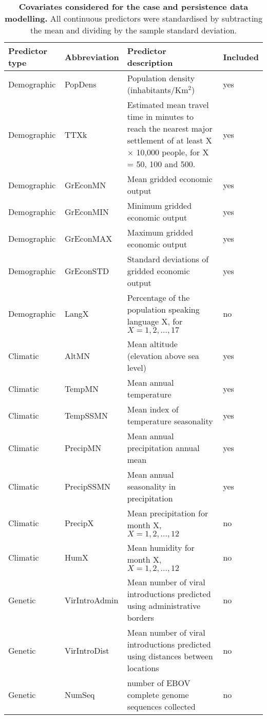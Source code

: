 \begin{minipage}{\textwidth}  
\setcounter{mpfootnote}{\value{footnote}}
\renewcommand{\thempfootnote}{\arabic{mpfootnote}}
\fontsize{9}{11}\selectfont
\begin{longtable}{ | l | l | p{} | l | }
\caption{\textbf{Covariates considered for the case and persistence data modelling.} All continuous predictors were standardised by subtracting the mean and dividing by the sample standard deviation.}
\label{tab:predictorTable}\\
\hline
Predictor type & Abbreviation & Predictor description & Included\footnotemark[1]\\
\hline
Demographic & PopDens & Population density (inhabitants/Km$^2$) & yes\\ 
\hline
Demographic & TTXk & Estimated mean travel time in minutes to reach the nearest major settlement of at least X $\times$ 10,000 people, for X = 50, 100 and 500. & yes\\ 
\hline
Demographic & GrEconMN & Mean gridded economic output & yes\\ 
\hline
Demographic & GrEconMIN & Minimum gridded economic output & yes\\ 
\hline
Demographic & GrEconMAX & Maximum gridded economic output & yes\\ 
\hline
Demographic & GrEconSTD & Standard deviations of gridded economic output & yes \\ 
\hline
Demographic & LangX & Percentage of the population speaking language X, for $X = 1, 2, \ldots, 17$ & no\\ 
\hline
Climatic & AltMN & Mean altitude (elevation above sea level)& yes\\ 
\hline
Climatic & TempMN & Mean annual temperature & yes \\ 
\hline
Climatic & TempSSMN & Mean index of temperature seasonality & yes\\ 
\hline
Climatic & PrecipMN & Mean annual precipitation annual mean & yes\\ 
\hline
Climatic & PrecipSSMN & Mean annual seasonality in precipitation & yes\\ 
\hline
Climatic & PrecipX & Mean precipitation for month X, $X = 1, 2, \ldots, 12$ & no\\ 
\hline
Climatic & HumX & Mean humidity for month X, $X = 1, 2, \ldots, 12$ & no\\ 
\hline
Genetic & VirIntroAdmin & Mean number of viral introductions predicted using administrative borders & no\\ 
\hline
Genetic & VirIntroDist & Mean number of viral introductions predicted using distances between locations & no\\ 
\hline
Genetic & NumSeq & number of EBOV complete genome sequences collected & no\\ 
\hline
\end{longtable}
\setcounter{footnote}{\value{mpfootnote}}
\end{minipage}

